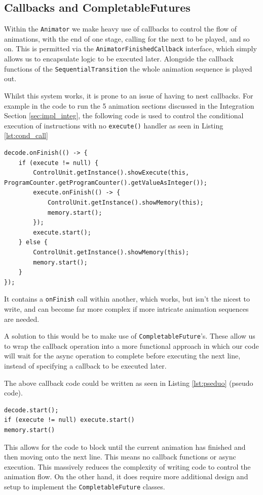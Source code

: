 \subsection{Callbacks and CompletableFutures}\label{sec:call_vs_cf}
Within the \texttt{Animator} we make heavy use of callbacks to control the flow of animations, with the end of one stage, calling for the next to be played, and so on. This is permitted via the \texttt{AnimatorFinishedCallback} interface, which simply allows us to encapsulate logic to be executed later. Alongside the callback functions of the \texttt{SequentialTransition} the whole animation sequence is played out.

Whilst this system works, it is prone to an issue of having to nest callbacks. For example in the code to run the 5 animation sections discussed in the Integration Section \ref{sec:impl_integ}, the following code is used to control the conditional execution of instructions with no \verb|execute()| handler as seen in Listing \ref{lst:cond_call}
\begin{lstlisting}[caption=Conditional callback execution, label=lst:cond_call]
decode.onFinish(() -> {
    if (execute != null) {
        ControlUnit.getInstance().showExecute(this, ProgramCounter.getProgramCounter().getValueAsInteger());
        execute.onFinish(() -> {
            ControlUnit.getInstance().showMemory(this);
            memory.start();
        });
        execute.start();
    } else {
        ControlUnit.getInstance().showMemory(this);
        memory.start();
    }
});
\end{lstlisting}
It contains a \verb|onFinish| call within another, which works, but isn't the nicest to write, and can become far more complex if more intricate animation sequences are needed.

A solution to this would be to make use of \texttt{CompletableFuture}'s. These allow us to wrap the callback operation into a more functional approach in which our code will wait for the async operation to complete before executing the next line, instead of specifying a callback to be executed later. 

The above callback code could be written as seen in Listing \ref{lst:pseduo} (pseudo code).
\begin{lstlisting}[caption=Functional pseduo code, label=lst:pseduo]
decode.start();
if (execute != null) execute.start()
memory.start()
\end{lstlisting}
This allows for the code to block until the current animation has finished and then moving onto the next line. This means no callback functions or async execution. This massively reduces the complexity of writing code to control the animation flow. On the other hand, it does require more additional design and setup to implement the \texttt{CompletableFuture} classes.

